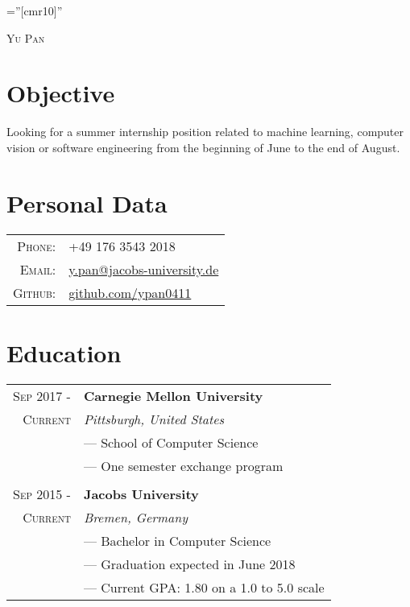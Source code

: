\documentclass[a4paper,10pt]{article}
\begin{document}
	
	
	\pagestyle{empty} %
	
	\font\fb=''[cmr10]'' %
	
	\par{\centering
		{\huge{\textsc{Yu Pan}}}\bigskip\par}
	
	\section{Objective}
	Looking for a summer internship position related to machine learning, computer vision or software engineering from the beginning of June to the end of August.
	
	
	\section{Personal Data}
	\begin{tabular}{rl}
		\textsc{Phone:}     & +49 176 3543 2018\\
		\textsc{Email:}     & \href{mailto:y.pan@jacobs-university.de}{y.pan@jacobs-university.de} \\
		\textsc{Github:} &
		\href{https://github.com/ypan0411}{github.com/ypan0411}
	\end{tabular}
	
	
	\section{Education}
	\begin{tabular}{r|l}
	    \textsc{Sep 2017 - } & \textbf{Carnegie Mellon University} \\\textsc{Current}&\emph{Pittsburgh, United States}
		\\& --- School of Computer Science
		\\& --- One semester exchange program
		\\ \multicolumn{2}{c}{} \\
		\textsc{Sep 2015 - } & \textbf{Jacobs University} \\\textsc{Current}&\emph{Bremen, Germany}
		\\& --- Bachelor in Computer Science
		\\& --- Graduation expected in June 2018
		\\& --- Current GPA: 1.80 on a 1.0 to 5.0 scale
	\end{tabular}
	
\end{document}
